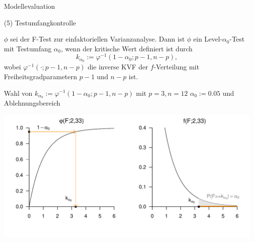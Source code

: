 \documentclass[
  8pt,
  ignorenonframetext,
]{beamer}
\begin{document}
\begin{frame}{Modellevaluation}
\protect\hypertarget{modellevaluation-15}{}
\vspace{2mm}

\noindent (5) Testumfangkontrolle

\footnotesize
\begin{theorem}[Testumfangkontrolle]
\justifying
\normalfont
$\phi$ sei der F-Test zur einfaktoriellen Varianzanalyse. Dann ist $\phi$ ein
Level-$\alpha_0$-Test mit Testumfang $\alpha_0$, wenn der kritische Wert definiert
ist durch
\begin{equation}
k_{\alpha_0} := \varphi^{-1}(1-\alpha_0;p-1, n-p),
\end{equation}
wobei $\varphi^{-1}(\cdot; p-1, n-p)$ die inverse KVF der $f$-Verteilung mit
Freiheitsgradparametern $p-1$ und $n-p$ ist.
\end{theorem}

\center

Wahl von \(k_{\alpha_0} := \varphi^{-1}(1 - \alpha_0; p-1, n-p)\) mit
\(p = 3, n =12\) \(\alpha_0 := 0.05\) und Ablehnungsbereich

\begin{center}\includegraphics[width=0.7\linewidth]{10_Abbildungen/alm_10_eva_testumfang} \end{center}
\end{frame}
\end{document}
